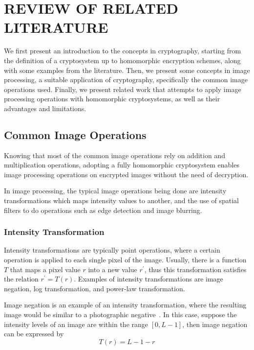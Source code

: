 \chapter{REVIEW OF RELATED LITERATURE}

We first present an introduction to the concepts in cryptography, starting from the definition of a cryptosystem up to homomorphic encryption schemes, along with some examples from the literature. Then, we present some concepts in image processing, a suitable application of cryptography, specifically the common image operations used. Finally, we present related work that attempts to apply image processing operations with homomorphic cryptosystems, as well as their advantages and limitations.



\section{Common Image Operations}

Knowing that most of the common image operations rely on addition and multiplication operations, adopting a fully homomorphic cryptosystem enables image processing operations on encrypted images without the need of decryption.

In image processing, the typical image operations being done are intensity transformations which maps intensity values to another, and the use of spatial filters to do operations such as edge detection and image blurring.

\subsection{Intensity Transformation}
Intensity transformations are typically point operations, where a certain operation is applied to each single pixel of the image. Usually, there is a function $T$ that maps a pixel value $r$ into a new value $r^\prime$, thus this transformation satisfies the relation $r^\prime = T\left(r\right)$. Examples of intensity transformations are image negation, log transformation, and power-law transformation.

Image negation is an example of an intensity transformation, where the resulting image would be similar to a photographic negative~\cite{gonzalez_digital_2008}. In this case, suppose the intensity levels of an image are within the range $\left[0, L-1\right]$, then image negation can be expressed by
\begin{equation}
    T\left(r\right) = L-1-r
\end{equation}

